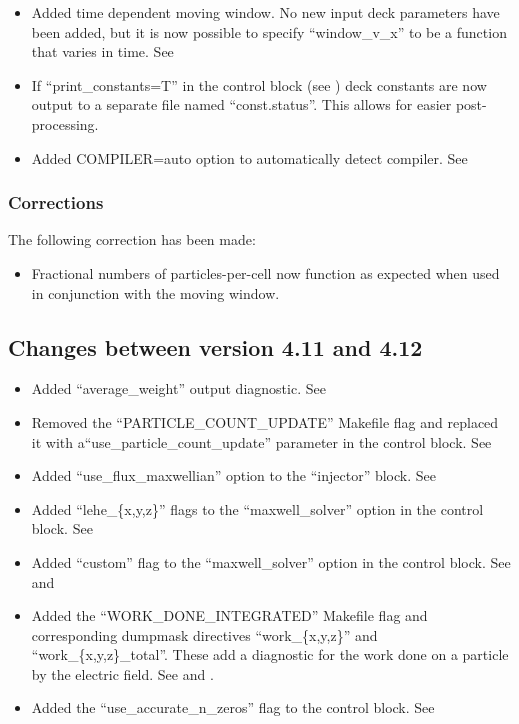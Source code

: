 \begin{itemize}
\item Added time dependent moving window. No new input deck parameters have
    been added, but it is now possible to specify ``window\_v\_x'' to be a
    function that varies in time. See 
\item If ``print\_constants=T'' in the control block (see )
    deck constants are now output to a separate file named ``const.status''.
    This allows for easier post-processing.
\item Added COMPILER=auto option to automatically detect compiler. See
\end{itemize}

\subsubsection{Corrections}

The following correction has been made:
\begin{itemize}
\item Fractional numbers of particles-per-cell now function as expected when
used in conjunction with the moving window.
\end{itemize}
\bigskip


\subsection{Changes between version 4.11 and 4.12}

\begin{itemize}
\item Added ``average\_weight'' output diagnostic.
    See 
\item Removed the ``PARTICLE\_COUNT\_UPDATE'' Makefile flag and replaced
    it with a\linebreak ``use\_particle\_count\_update'' parameter in the
    control block. See 
\item Added ``use\_flux\_maxwellian'' option to the ``injector'' block.
    See 
\item Added ``lehe\_\{x,y,z\}'' flags to the ``maxwell\_solver'' option in
    the control block. See 
\item Added ``custom'' flag to the ``maxwell\_solver'' option in
    the control block. See  and 
\item Added the ``WORK\_DONE\_INTEGRATED'' Makefile flag and corresponding
    dumpmask directives ``work\_\{x,y,z\}'' and ``work\_\{x,y,z\}\_total''.
    These add a diagnostic for the work done on a particle by the electric
    field. See  and .
\item Added the ``use\_accurate\_n\_zeros'' flag to the control block.
    See 
\end{itemize}
\bigskip


